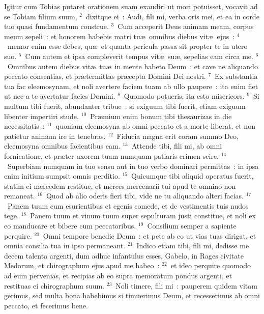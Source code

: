 \lettrine[lines=10,image=true,loversize=0.05,lraise=-0.03]{I}{}gitur cum Tobias putaret orationem suam exaudiri ut mori potuisset, vocavit ad se Tobiam filium suum,
${}^{2}$~dixitque ei~: Audi, fili mi, verba oris mei, et ea in corde tuo quasi fundamentum construe.
${}^{3}$~Cum acceperit Deus animam meam, corpus meum sepeli~: et honorem habebis matri tu\ae\ omnibus diebus vit\ae\ ejus~:
${}^{4}$~memor enim esse debes, qu\ae\ et quanta pericula passa sit propter te in utero suo.
${}^{5}$~Cum autem et ipsa compleverit tempus vit\ae\ su\ae , sepelias eam circa me.
${}^{6}$~Omnibus autem diebus vit\ae\ tu\ae\ in mente habeto Deum~: et cave ne aliquando peccato consentias, et pr\ae termittas pr\ae cepta Domini Dei nostri.
${}^{7}$~Ex substantia tua fac eleemosynam, et noli avertere faciem tuam ab ullo paupere~: ita enim fiet ut nec a te avertatur facies Domini.
${}^{8}$~Quomodo potueris, ita esto misericors.
${}^{9}$~Si multum tibi fuerit, abundanter tribue~: si exiguum tibi fuerit, etiam exiguum libenter impertiri stude.
${}^{10}$~Pr\ae mium enim bonum tibi thesaurizas in die necessitatis~:
${}^{11}$~quoniam eleemosyna ab omni peccato et a morte liberat, et non patietur animam ire in tenebras.
${}^{12}$~Fiducia magna erit coram summo Deo, eleemosyna omnibus facientibus eam.
${}^{13}$~Attende tibi, fili mi, ab omni fornicatione, et pr\ae ter uxorem tuam numquam patiaris crimen scire.
${}^{14}$~Superbiam numquam in tuo sensu aut in tuo verbo dominari permittas~: in ipsa enim initium sumpsit omnis perditio.
${}^{15}$~Quicumque tibi aliquid operatus fuerit, statim ei mercedem restitue, et merces mercenarii tui apud te omnino non remaneat.
${}^{16}$~Quod ab alio oderis fieri tibi, vide ne tu aliquando alteri facias.
${}^{17}$~Panem tuum cum esurientibus et egenis comede, et de vestimentis tuis nudos tege.
${}^{18}$~Panem tuum et vinum tuum super sepulturam justi constitue, et noli ex eo manducare et bibere cum peccatoribus.
${}^{19}$~Consilium semper a sapiente perquire.
${}^{20}$~Omni tempore benedic Deum~: et pete ab eo ut vias tuas dirigat, et omnia consilia tua in ipso permaneant.
${}^{21}$~Indico etiam tibi, fili mi, dedisse me decem talenta argenti, dum adhuc infantulus esses, Gabelo, in Rages civitate Medorum, et chirographum ejus apud me habeo~:
${}^{22}$~et ideo perquire quomodo ad eum pervenias, et recipias ab eo supra memoratum pondus argenti, et restituas ei chirographum suum.
${}^{23}$~Noli timere, fili mi~: pauperem quidem vitam gerimus, sed multa bona habebimus si timuerimus Deum, et recesserimus ab omni peccato, et fecerimus bene.

